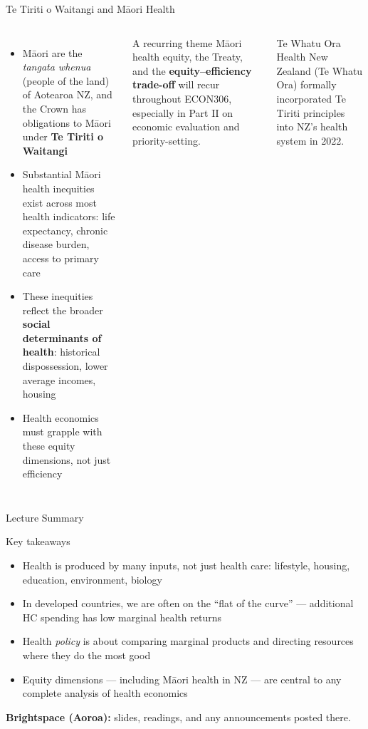 \documentclass[aspectratio=169, 12pt]{beamer}
\newcommand{\summaryside}[1]{%
  \begin{frame}{Lecture Summary}
    \begin{exampleblock}{Key takeaways}
      \begin{itemize}#1\end{itemize}
    \end{exampleblock}
    \vspace{0.5em}
    {\footnotesize\textcolor{OtagoGold}{\textbf{Brightspace (Aoroa):}} slides, readings, and any announcements posted there.}
  \end{frame}}
\begin{document}
\begin{frame}{Te Tiriti o Waitangi and Māori Health}
  \begin{columns}
      \begin{itemize}
        \item Māori are the \textit{tangata whenua} (people of the land) of Aotearoa NZ, and
              the Crown has obligations to Māori under \textbf{Te Tiriti o Waitangi}
        \item Substantial Māori health inequities exist across most health indicators:
              life expectancy, chronic disease burden, access to primary care
        \item These inequities reflect the broader \textbf{social determinants of health}:
              historical dispossession, lower average incomes, housing
        \item Health economics must grapple with these equity dimensions, not just efficiency
      \end{itemize}
      \begin{alertblock}{A recurring theme}
        Māori health equity, the Treaty, and the \textbf{equity--efficiency trade-off} will
        recur throughout ECON306, especially in Part II on economic evaluation and priority-setting.
      \end{alertblock}
      \vspace{0.3em}
      \begin{block}{Te Whatu Ora}
        Health New Zealand (Te Whatu Ora) formally incorporated Te Tiriti principles into NZ's
        health system in 2022.
      \end{block}
  \end{columns}
\end{frame}

\summaryside{
  \item Health is produced by many inputs, not just health care: lifestyle, housing, education, environment, biology
  \item In developed countries, we are often on the ``flat of the curve'' --- additional HC spending has low marginal health returns
  \item Health \emph{policy} is about comparing marginal products and directing resources where they do the most good
  \item Equity dimensions --- including Māori health in NZ --- are central to any complete analysis of health economics
}
\end{document}
